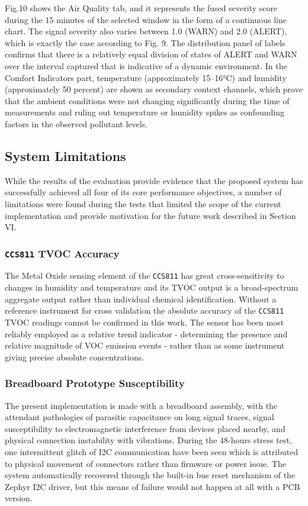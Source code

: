 \documentclass[conference]{IEEEtran}
\begin{document}
Fig.10 shows the Air Quality tab, and it represents the fused severity score during the 15 minutes of the selected window in the form of a continuous line chart. The signal severity also varies between 1.0 (WARN) and 2.0 (ALERT), which is exactly the case according to Fig. 9. The distribution panel of labels confirms that there is a relatively equal division of states of ALERT and WARN over the interval captured that is indicative of a dynamic environment. In the Comfort Indicators part, temperature (approximately 15–16°C) and humidity (approximately 50 percent) are shown as secondary context channels, which prove that the ambient conditions were not changing significantly during the time of measurements and ruling out temperature or humidity spikes as confounding factors in the observed pollutant levels.  

\subsection{System Limitations}

While the results of the evaluation provide evidence that the proposed system has successfully achieved all four of its core performance objectives, a number of limitations were found during the tests that limited the scope of the current implementation and provide motivation for the future work described in Section VI.

\subsubsection{\texttt{CCS811} TVOC Accuracy}
The Metal Oxide sensing element of the \texttt{CCS811} has great cross-sensitivity to changes in humidity and temperature and its TVOC output is a broad-spectrum aggregate output rather than individual chemical identification. Without a reference instrument for cross validation the absolute accuracy of the \texttt{CCS811} TVOC readings cannot be confirmed in this work. The sensor has been most reliably employed as a relative trend indicator - determining the presence and relative magnitude of VOC emission events - rather than as some instrument giving precise absolute concentrations.

\subsubsection{Breadboard Prototype Susceptibility}
The present implementation is made with a breadboard assembly, with the attendant pathologies of parasitic capacitance on long signal traces, signal susceptibility to electromagnetic interference from devices placed nearby, and physical connection instability with vibrations. During the 48-hours stress test, one intermittent glitch of I2C communication have been seen which is attributed to physical movement of connectors rather than firmware or power issue. The system automatically recovered through the built-in bus reset mechanism of the Zephyr I2C driver, but this means of failure would not happen at all with a PCB version.
\end{document}
